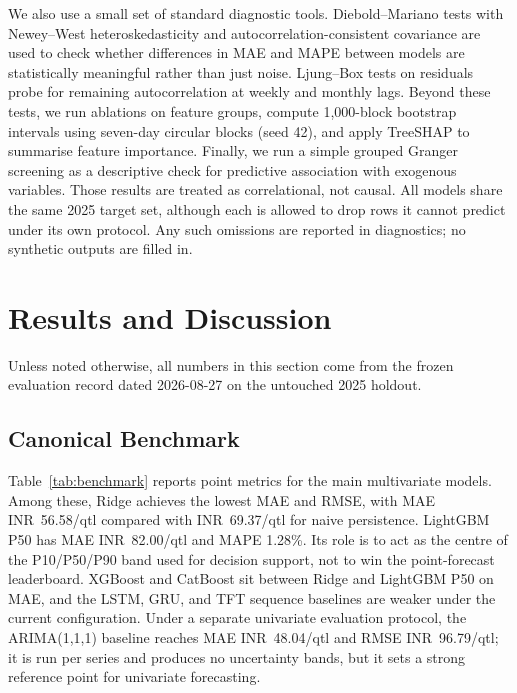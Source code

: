 \documentclass[a4paper,conference]{IEEEtran}
\begin{document}
We also use a small set of standard diagnostic tools. Diebold--Mariano tests with Newey--West heteroskedasticity and autocorrelation-consistent covariance \cite{diebold1995comparing,newey1987simple} are used to check whether differences in MAE and MAPE between models are statistically meaningful rather than just noise. Ljung--Box tests on residuals \cite{ljung1978measure} probe for remaining autocorrelation at weekly and monthly lags. Beyond these tests, we run ablations on feature groups, compute 1{,}000-block bootstrap intervals using seven-day circular blocks (seed 42), and apply TreeSHAP \cite{lundberg2020local} to summarise feature importance. Finally, we run a simple grouped Granger screening \cite{granger1969investigating} as a descriptive check for predictive association with exogenous variables. Those results are treated as correlational, not causal. All models share the same 2025 target set, although each is allowed to drop rows it cannot predict under its own protocol. Any such omissions are reported in diagnostics; no synthetic outputs are filled in.

\section{Results and Discussion}
Unless noted otherwise, all numbers in this section come from the frozen evaluation record dated 2026-08-27 on the untouched 2025 holdout.

\subsection{Canonical Benchmark}
Table~\ref{tab:benchmark} reports point metrics for the main multivariate models. Among these, Ridge achieves the lowest MAE and RMSE, with MAE INR~56.58/qtl compared with INR~69.37/qtl for naive persistence. LightGBM P50 has MAE INR~82.00/qtl and MAPE 1.28\%. Its role is to act as the centre of the P10/P50/P90 band used for decision support, not to win the point-forecast leaderboard. XGBoost and CatBoost sit between Ridge and LightGBM P50 on MAE, and the LSTM, GRU, and TFT sequence baselines are weaker under the current configuration. Under a separate univariate evaluation protocol, the ARIMA(1,1,1) baseline reaches MAE INR~48.04/qtl and RMSE INR~96.79/qtl; it is run per series and produces no uncertainty bands, but it sets a strong reference point for univariate forecasting.
\end{document}
